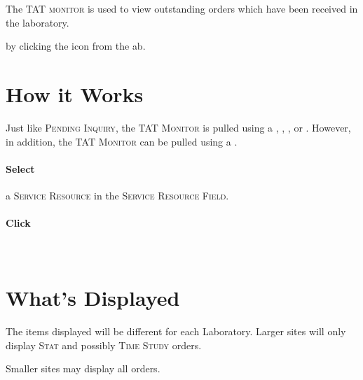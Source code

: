 The \textsc{TAT monitor} is used to view outstanding orders which have been received in the laboratory.

 by clicking the  icon from the \gls{ab}.\\


\section{How it Works}

Just like \textsc{Pending Inquiry}, the \textsc{TAT Monitor} is pulled using a {\sect}, {\subsect}, \bench, or \instrument. However, in addition, the \textsc{TAT Monitor} can be pulled using a \site.

\paragraph{Select} a \textsc{Service Resource} in the \textsc{Service Resource Field}.\\


\paragraph{Click} \\


\section{What's Displayed}

The items displayed will be different for each Laboratory. Larger sites will only display \textsc{Stat} and possibly \textsc{Time Study} orders.

Smaller sites may display all orders.